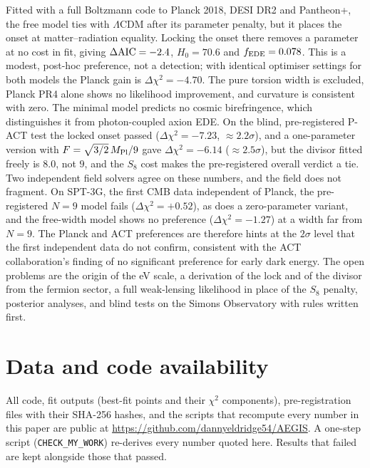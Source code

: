 \documentclass[11pt]{article}
\newcommand{\Mp}{M_{\rm Pl}}
\begin{document}
Fitted with a full Boltzmann code to Planck 2018, DESI DR2 and Pantheon+, the free model ties
with $\Lambda$CDM after its parameter penalty, but it places the onset at matter--radiation
equality. Locking the onset there removes a parameter at no cost in fit, giving
$\Delta{\rm AIC}=-2.4$, $H_0=70.6$ and $f_{\rm EDE}=0.078$. This is a modest, post-hoc
preference, not a detection; with identical optimiser settings for both models the Planck gain
is $\Delta\chi^2=-4.70$. The pure torsion width is excluded, Planck PR4 alone shows no
likelihood improvement, and curvature is consistent with zero. The minimal model predicts
no cosmic birefringence, which distinguishes it from photon-coupled axion EDE. On the blind,
pre-registered P-ACT test the locked onset passed ($\Delta\chi^2=-7.23$, $\approx2.2\sigma$), and a
one-parameter version with $F=\sqrt{3/2}\,\Mp/9$ gave $\Delta\chi^2=-6.14$ ($\approx2.5\sigma$), but
the divisor fitted freely is $8.0$, not $9$, and the $S_8$ cost makes the pre-registered overall
verdict a tie. Two independent field solvers agree on these numbers, and the field does not fragment.
On SPT-3G, the first CMB data independent of Planck, the pre-registered $N=9$ model fails
($\Delta\chi^2=+0.52$), as does a zero-parameter variant, and the free-width model shows no preference
($\Delta\chi^2=-1.27$) at a width far from $N=9$. The Planck and ACT preferences are therefore
hints at the $2\sigma$ level that the first independent data do not confirm, consistent with the ACT
collaboration's finding of no significant preference for early dark energy. The open problems are the
origin of the eV scale, a derivation of the lock and of the divisor from the fermion sector, a full
weak-lensing likelihood in place of the $S_8$ penalty, posterior analyses, and blind tests on the
Simons Observatory with rules written first.

\section*{Data and code availability}
All code, fit outputs (best-fit points and their $\chi^2$ components), pre-registration files
with their SHA-256 hashes, and the scripts that recompute every number in this paper are
public at \url{https://github.com/dannyeldridge54/AEGIS}. A one-step script (\texttt{CHECK\_MY\_WORK}) re-derives
every number quoted here. Results that failed are kept alongside those that passed.
\end{document}
